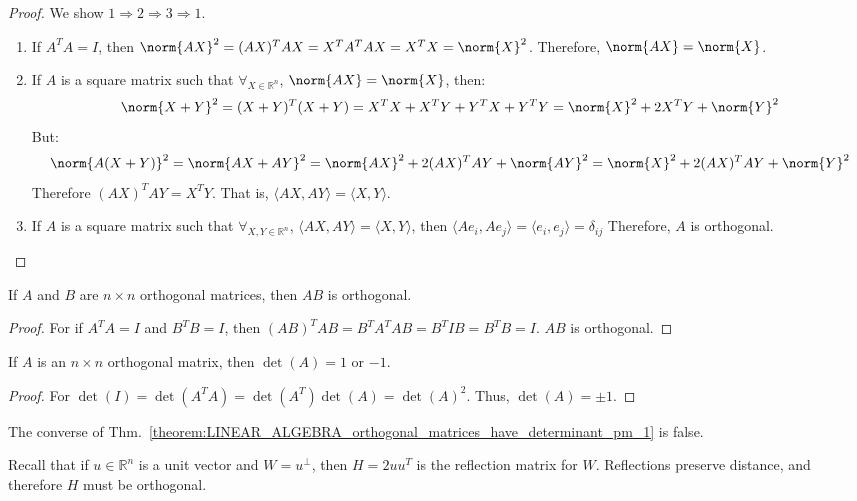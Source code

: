 \documentclass[crop=false,class=book,oneside]{standalone}
\begin{document}
\begin{proof}
We show $1\Rightarrow 2 \Rightarrow 3 \Rightarrow 1$.
\begin{enumerate}
    \item If $A^TA = I$, then $\norm{AX}^{2}=(AX)^{T}AX=X^{T}A^{T}AX=X^{T}X=\norm{X}^{2}$. Therefore, $\norm{AX}=\norm{X}$.
    \item If $A$ is a square matrix such that $\forall_{X\in\mathbb{R}^{n}}$, $\norm{AX} = \norm{X}$, then:
    \begin{equation*}
        \norm{X+Y}^{2}=(X+Y)^T(X+Y)=X^TX+X^TY+Y^TX+Y^TY=\norm{X}^2+2X^TY+\norm{Y}^2
    \end{equation*}
    But:
    \begin{equation*}
        \norm{A(X+Y)}^{2}=\norm{AX+AY}^{2}=\norm{AX}^{2}+2(AX)^{T}AY+\norm{AY}^2=\norm{X}^{2}+2(AX)^{T}AY+\norm{Y}^2
    \end{equation*}
    Therefore $(AX)^TAY = X^TY$. That is, $\langle AX, AY\rangle = \langle X, Y\rangle$.
    \item If $A$ is a square matrix such that $\forall_{X,Y\in \mathbb{R}^n}$, $\langle AX, AY\rangle = \langle X, Y\rangle$, then $\langle Ae_{i}, Ae_{j}\rangle=\langle e_i,e_j\rangle=\delta_{ij}$
    Therefore, $A$ is orthogonal.
\end{enumerate}
\end{proof}
\begin{theorem}
If $A$ and $B$ are $n\times n$ orthogonal matrices, then $AB$ is orthogonal.
\end{theorem}
\begin{proof}
For if $A^{T}A = I$ and $B^{T}B = I$, then $(AB)^{T}AB = B^{T}A^{T}AB = B^{T}IB = B^{T}B = I$. $AB$ is orthogonal.
\end{proof}
\begin{theorem}
\label{theorem:LINEAR_ALGEBRA_orthogonal_matrices_have_determinant_pm_1}
If $A$ is an $n\times n$ orthogonal matrix, then $\det(A) = 1$ or $-1$.
\end{theorem}
\begin{proof}
For $\det(I) = \det(A^TA) = \det(A^T)\det(A) = \det(A)^2$. Thus, $\det(A) = \pm 1$.
\end{proof}
\begin{remark}
The converse of Thm.~\ref{theorem:LINEAR_ALGEBRA_orthogonal_matrices_have_determinant_pm_1} is false.
\end{remark}
Recall that if $u\in \mathbb{R}^n$ is a unit vector and $W = u^{\perp}$, then $H=2uu^T$ is the reflection matrix for $W$. Reflections preserve distance, and therefore $H$ must be orthogonal.
\end{document}
